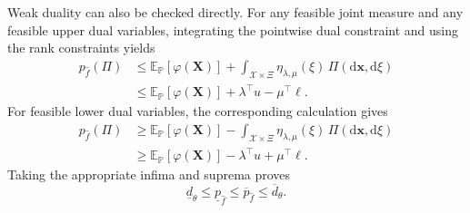 Weak duality can also be checked directly. For any feasible joint measure and any feasible upper dual variables, integrating the pointwise dual constraint and using the rank constraints yields
\[
  \begin{aligned}
    p_{\hat f}(\Pi)
    &\le\mathbb E_{\mathbb P}\left[\varphi(\bm X)\right]
    +\int_{\mathcal X\times\Xi}\eta_{\lambda,\mu}(\xi)\,\Pi\left(\mathrm d\bm x,\mathrm d\xi\right)\\
    &\le\mathbb E_{\mathbb P}\left[\varphi(\bm X)\right]+\lambda^\top u-\mu^\top\ell.
  \end{aligned}
\]
For feasible lower dual variables, the corresponding calculation gives
\[
  \begin{aligned}
    p_{\hat f}(\Pi)
    &\ge\mathbb E_{\mathbb P}\left[\varphi(\bm X)\right]
    -\int_{\mathcal X\times\Xi}\eta_{\lambda,\mu}(\xi)\,\Pi\left(\mathrm d\bm x,\mathrm d\xi\right)\\
    &\ge\mathbb E_{\mathbb P}\left[\varphi(\bm X)\right]-\lambda^\top u+\mu^\top\ell.
  \end{aligned}
\]
Taking the appropriate infima and suprema proves
\begin{equation}
  \underline d_\theta\le\underline p_{\hat f}\le\overline p_{\hat f}\le\overline d_\theta.
  \label{eq-weak-duality}
\end{equation}

